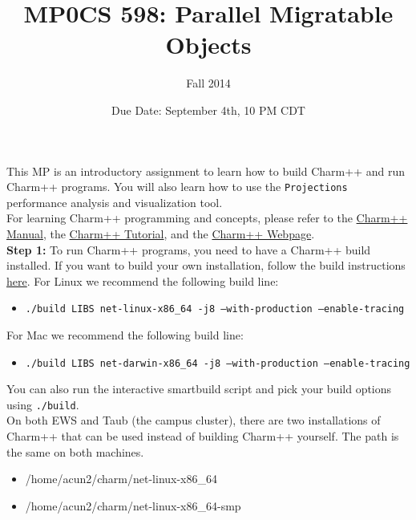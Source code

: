 \documentclass{article}
\title{MP0}
\title{CS 598: Parallel Migratable Objects}
\author{Fall 2014}
\date{Due Date: September 4th, 10 PM CDT}
\begin{document}
\maketitle

This MP is an introductory assignment to learn how to build Charm++ and run
Charm++ programs. You will also learn how to use the \texttt{Projections}
performance analysis and visualization tool. \\

For learning Charm++ programming and concepts, please refer to the
\href{http://charm.cs.illinois.edu/manuals/html/charm++/}{Charm++ Manual},
the \href{http://charm.cs.illinois.edu/tutorial/}{Charm++ Tutorial},
and the \href{http://charmplusplus.org/}{Charm++ Webpage}.\\

\textbf{Step 1:} To run Charm++ programs, you need to have a Charm++ build
installed. If you want to build your own installation, follow the build
instructions \href{http://charm.cs.illinois.edu/manuals/html/charm++/A.html}{here}.
For Linux we recommend the following build line:
\begin{itemize}
\item \texttt{./build LIBS net-linux-x86\_64 -j8 --with-production --enable-tracing}
\end{itemize}
For Mac we recommend the following build line:
\begin{itemize}
\item \texttt{./build LIBS net-darwin-x86\_64 -j8 --with-production --enable-tracing}
\end{itemize}
You can also run the interactive smartbuild script and pick your build options using \texttt{./build}.\\

On both EWS and Taub (the campus cluster), there are two installations of Charm++ that can
be used instead of building Charm++ yourself. The path is the same on both machines.
\begin{itemize}
\item /home/acun2/charm/net-linux-x86\_64
\item /home/acun2/charm/net-linux-x86\_64-smp\\
\end{itemize}
\end{document}
